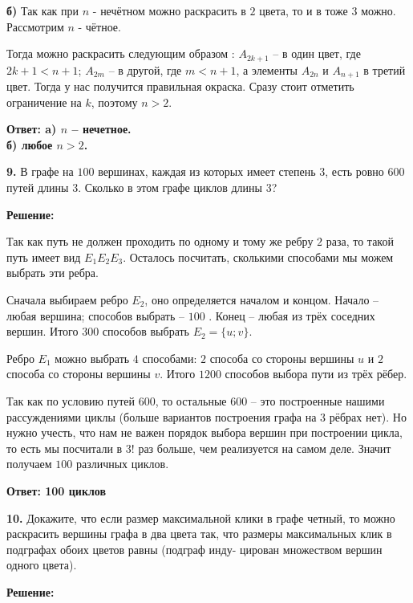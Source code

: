 \documentclass[a4paper,12pt]{article} %
\begin{document}
{\bf б)} Так как при $n$ - нечётном можно раскрасить в $2$ цвета, то и в тоже $3$ можно. Рассмотрим $n$ - чётное.

Тогда можно раскрасить следующим образом : $A_{2k+1}$ -- в один цвет, где $2k+1 < n+1$; $A_{2m}$ -- в другой, где $m < n+1$, а элементы $A_{2n}$ и $A_{n+1}$ в третий цвет. Тогда у нас получится правильная окраска. Сразу стоит отметить ограничение на $k$, поэтому $n > 2$. 

\begin{flushright}
\begin{large}
\textbf {Ответ: {\bf a)} $n$ -- нечетное.\\
{\bf б)} любое $n > 2$.}
\end{large}
\end{flushright}

{\bf 9.} В графе на $100$ вершинах, каждая из которых имеет степень $3$, есть
ровно $600$ путей длины $3$. Сколько в этом графе циклов длины $3$?
\begin{center}
\bfseries
{\Large Решение: }
\end{center}

Так как путь не должен проходить по одному и тому же ребру $2$ раза, то такой путь имеет вид $E_1E_2E_3$. Осталось посчитать, сколькими способами мы можем выбрать эти ребра.

Сначала выбираем ребро $E_2$, оно определяется началом и концом. Начало -- любая вершина; способов выбрать -- $100$ . Конец -- любая из трёх соседних вершин. Итого $300$ способов выбрать $E_2 = \{ u ; v\}$.

Ребро $E_1$ можно выбрать $4$ способами: $2$ способа со стороны вершины $u$ и $2$ способа со стороны вершины $v$. Итого $1200$ способов выбора пути из трёх рёбер.

Так как по условию путей $600$, то остальные $600$ -- это построенные нашими рассуждениями циклы (больше вариантов построения графа на $3$ рёбрах нет). Но нужно учесть, что нам не важен порядок выбора вершин при построении цикла, то есть мы посчитали в $3!$ раз больше, чем реализуется на самом деле. Значит получаем $100$ различных циклов.


\begin{flushright}
\begin{large}
\textbf {Ответ: 100 циклов }
\end{large}
\end{flushright}

{\bf 10.} Докажите, что если размер максимальной клики в графе четный,
то можно раскрасить вершины графа в два цвета так, что размеры
максимальных клик в подграфах обоих цветов равны (подграф инду-
цирован множеством вершин одного цвета).
\begin{center}
\bfseries
{\Large Решение: }
\end{center}
\end{document}
